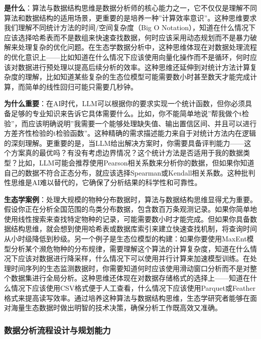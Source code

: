 \documentclass[
  twoside]{book}
\begin{document}
\textbf{是什么}：算法与数据结构思维是数据分析师的核心能力之一，它不仅仅是理解不同算法和数据结构的适用场景，更重要的是培养一种''计算效率意识''。这种思维要求我们理解不同统计方法的时间/空间复杂度（Big O Notation），知道在什么情况下应该选择哈希表而不是数组来快速查找数据，何时应该采用动态规划而不是暴力破解来处理复杂的优化问题。在生态学数据分析中，这种思维体现在对数据处理流程的优化意识上------比如知道在什么情况下应该使用向量化操作而不是循环，何时应该对数据进行预处理以提高后续分析的效率。这种思维还延伸到对统计方法计算复杂度的理解，比如知道某些复杂的生态位模型可能需要数小时甚至数天才能完成计算，而简单的线性回归可能只需要几秒钟。

\textbf{为什么重要}：在AI时代，LLM可以根据你的要求实现一个统计函数，但你必须具备足够的专业知识来告诉它具体需要什么。比如，你不能简单地说''帮我做个t检验''，而应该明确说明''我需要一个能够处理缺失值、输出置信区间、并且可以进行方差齐性检验的t检验函数''。这种精确的需求描述能力来自于对统计方法内在逻辑的深刻理解。更重要的是，当LLM给出解决方案时，你需要具备评判能力------这个方案真的最优吗？有没有考虑边界情况？这个统计方法是否适用于我的数据类型？比如，LLM可能会推荐使用Pearson相关系数来分析你的数据，但如果你知道自己的数据不符合正态分布，就应该选择Spearman或Kendall相关系数。这种批判性思维是AI难以替代的，它确保了分析结果的科学性和可靠性。

\textbf{生态学案例}：处理大规模的物种分布数据时，算法与数据结构思维显得尤为重要。假设你正在分析全国范围的鸟类分布数据，包含数百万条观测记录。如果你简单地使用线性搜索来查找特定物种的记录，可能需要数小时才能完成。但如果你具备数据结构思维，就会想到使用哈希表或数据库索引来建立快速查找机制，将查询时间从小时级降低到秒级。另一个例子是生态位模型的构建：如果你要使用MaxEnt模型分析某个濒危物种的分布规律，需要理解这个算法的计算复杂度，知道在什么情况下应该对数据进行降采样，什么情况下可以使用并行计算来加速模型训练。在处理时间序列的生态监测数据时，你需要知道何时应该使用滑动窗口分析而不是对整个数据集进行全局分析。这种思维还体现在对数据存储格式的选择上------知道在什么情况下应该使用CSV格式便于人工查看，什么情况下应该使用Parquet或Feather格式来提高读写效率。通过培养这种算法与数据结构思维，生态学研究者能够在面对海量生态数据时做出明智的技术决策，确保分析工作既高效又准确。

\hypertarget{ux6570ux636eux5206ux6790ux6d41ux7a0bux8bbeux8ba1ux4e0eux89c4ux5212ux80fdux529b}{%
\subsubsection{数据分析流程设计与规划能力}\label{ux6570ux636eux5206ux6790ux6d41ux7a0bux8bbeux8ba1ux4e0eux89c4ux5212ux80fdux529b}}
\end{document}
